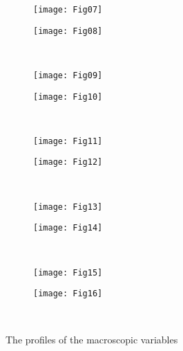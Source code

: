 \documentclass[aip,pof,preprint]{revtex4-1}
\begin{document}
\begin{figure}
    \vspace{-24pt}
    \centering
    \begin{subfigure}[b]{.5\linewidth}
        \texttt{[image: Fig07]}
        \label{fig:profile:Pxy}
    \end{subfigure}%
    \begin{subfigure}[b]{.5\linewidth}
        \texttt{[image: Fig08]}
        \label{fig:profile:vx}
    \end{subfigure}\\[-6pt]
    \begin{subfigure}[b]{.5\linewidth}
        \texttt{[image: Fig09]}
        \label{fig:profile:qx}
    \end{subfigure}%
    \begin{subfigure}[b]{.5\linewidth}
        \texttt{[image: Fig10]}
        \label{fig:profile:qy}
    \end{subfigure}\\[-6pt]
    \begin{subfigure}[b]{.5\linewidth}
        \texttt{[image: Fig11]}
        \label{fig:profile:P}
    \end{subfigure}%
    \begin{subfigure}[b]{.5\linewidth}
        \texttt{[image: Fig12]}
        \label{fig:profile:Pyy}
    \end{subfigure}\\[-6pt]
    \begin{subfigure}[b]{.5\linewidth}
        \texttt{[image: Fig13]}
        \label{fig:profile:Pxx}
    \end{subfigure}%
    \begin{subfigure}[b]{.5\linewidth}
        \texttt{[image: Fig14]}
        \label{fig:profile:Pzz}
    \end{subfigure}\\[-6pt]
\end{figure}
\begin{figure}
    \ContinuedFloat
    \begin{subfigure}[b]{.5\linewidth}
        \texttt{[image: Fig15]}
        \label{fig:profile:tau}
    \end{subfigure}%
    \begin{subfigure}[b]{.5\linewidth}
        \texttt{[image: Fig16]}
        \label{fig:profile:omega}
    \end{subfigure}\\[-12pt]
    \caption{The profiles of the macroscopic variables}
    \label{fig:profiles}
\end{figure}
\end{document}
